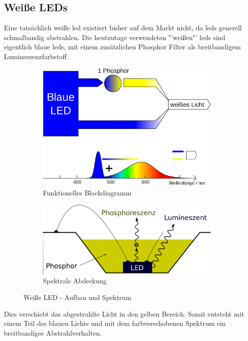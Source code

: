 \documentclass[11pt]{scrartcl}
\begin{document}
\subsection{Weiße LEDs}
Eine tatsächlich weiße \ac{led} existiert bisher auf dem Markt nicht, da \ac{led}s generell schmalbandig abstrahlen. Die heutzutage
verwendeten "'weißen"' \ac{led}s sind eigentlich blaue \ac{led}s, mit einem zusätzlichen Phosphor Filter als breitbandigem Lumineszenzfarbstoff.
\begin{figure}[H]
    \centering
    \begin{subfigure}[b]{0.49\textwidth}
        \includegraphics[width=\textwidth]{images/LED_weiss_P_blau.png}
        \caption{Funktionelles Blockdiagramm}
    \end{subfigure}
    \hfill 
    \begin{subfigure}[b]{0.49\textwidth}
        \includegraphics[width=\textwidth]{images/LED_weiss_phosphor.png}
        \caption{Spektrale Abdeckung}
    \end{subfigure}
    \caption{Weiße LED - Aufbau und Spektrum \cite{wikiLed}}\label{fig:White LED}
\end{figure}
\noindent
Dies verschiebt das abgestrahlte Licht in den gelben Bereich. Somit entsteht mit einem Teil des blauen Lichts und mit dem farbverschobenen Spektrum
ein breitbandiges Abstrahlverhalten.
\clearpage
\end{document}
